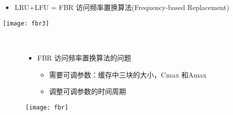 \begin{frame}[plain]
	\frametitle{ }
	\begin{columns}
		\begin{column}{.0\textwidth}
			\centering
		\end{column}
		
		\begin{column}{1.0\textwidth}
			
			\begin{itemize}
				\item LRU+LFU = FBR 访问频率置换算法(Frequency-based Replacement)
				
			\end{itemize}
			
			\texttt{[image: fbr3]}
		\end{column}
		
		
	\end{columns}
\end{frame}



\begin{frame}[plain]
	\frametitle{ }
	\begin{columns}
		\begin{column}{.0\textwidth}
			\centering
		\end{column}
		
		\begin{column}{1.0\textwidth}
			
			\begin{itemize}
				\item FBR 访问频率置换算法的问题
				
					\begin{itemize}
					\item 需要可调参数：缓存中三块的大小，Cmax 和Amax
					\item 调整可调参数的时间周期
				\end{itemize}
			\end{itemize}
			\centering
			\texttt{[image: fbr]}
		\end{column}
		
		
	\end{columns}
\end{frame}







